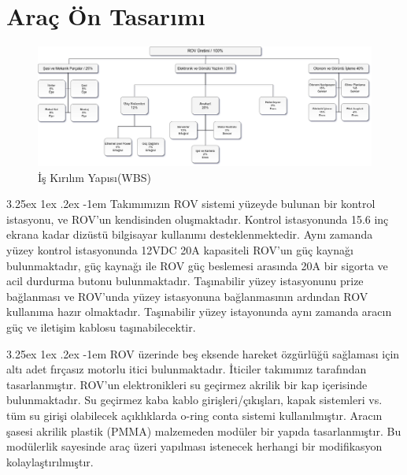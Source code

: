 \documentclass[12pt]{article}
\makeatletter
\renewcommand\paragraph{\@startsection{paragraph}{5}{\z@}%
  {3.25ex \@plus1ex \@minus.2ex}%
  {-1em}%
  {\normalfont\normalsize\bfseries}}
\makeatother
\begin{document}

\section{Araç Ön Tasarımı}

\begin{figure}[hbt!]
\centering
\includegraphics[width=1\textwidth]{WBS.png}
\caption{İş Kırılım Yapısı(WBS)}
\label{fig:wbs}
\end{figure}

\paragraph{} Takımımızın ROV sistemi yüzeyde bulunan bir kontrol istasyonu, ve ROV'un kendisinden oluşmaktadır. Kontrol istasyonunda 15.6 inç ekrana kadar dizüstü bilgisayar kullanımı desteklenmektedir. Aynı zamanda yüzey kontrol istasyonunda 12VDC 20A kapasiteli ROV'un güç kaynağı bulunmaktadır, güç kaynağı ile ROV güç beslemesi arasında 20A bir sigorta ve acil durdurma butonu bulunmaktadır. Taşınabilir yüzey istasyonunu prize bağlanması ve ROV'unda yüzey istasyonuna bağlanmasının ardından ROV kullanıma hazır olmaktadır. Taşınabilir yüzey istayonunda aynı zamanda aracın güç ve iletişim kablosu taşınabilecektir. 

\paragraph{} ROV üzerinde beş eksende hareket özgürlüğü sağlaması için altı adet fırçasız motorlu itici bulunmaktadır. İticiler takımımız tarafından tasarlanmıştır. ROV'un elektronikleri su geçirmez akrilik bir kap içerisinde bulunmaktadır. Su geçirmez kaba kablo girişleri/çıkışları, kapak sistemleri vs. tüm su girişi olabilecek açıklıklarda o-ring conta sistemi kullanılmıştır. Aracın şasesi akrilik plastik (PMMA) malzemeden modüler bir yapıda tasarlanmıştır. Bu modülerlik sayesinde araç üzeri yapılması istenecek herhangi bir modifikasyon kolaylaştırılmıştır.
\end{document}

